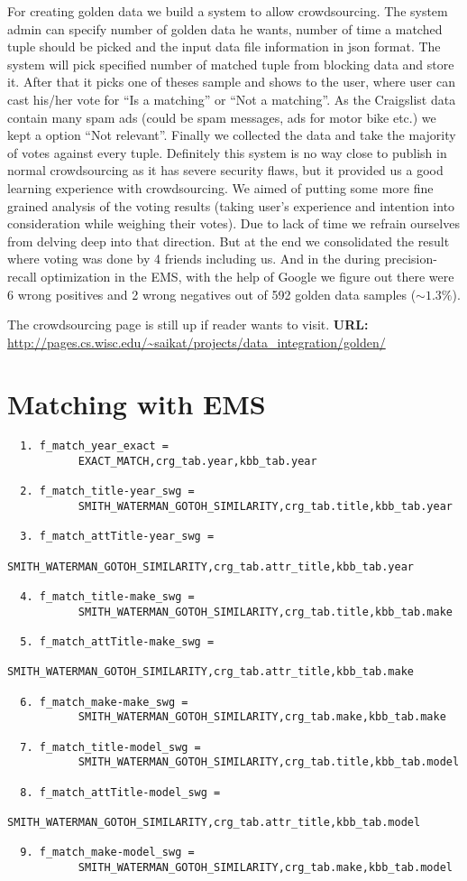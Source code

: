 \documentclass[dvips,11pt]{article}
\begin{document}
For creating golden data we build a system to allow crowdsourcing. The system admin can specify
number of golden data he wants, number of time a matched tuple should be picked and the input data
file information in json format. The system will pick specified number of matched tuple from
blocking data and store it. After that it picks one of theses sample and shows to the user, where
user can cast his/her vote for ``Is a matching'' or ``Not a matching''. As the Craigslist data
contain many spam ads (could be spam messages, ads for motor bike etc.) we kept a option ``Not
relevant''. Finally we collected the data and take the majority of votes against every
tuple. Definitely this system is no way close to publish in normal crowdsourcing as it has severe
security flaws, but it provided us a good learning experience with crowdsourcing. We aimed of
putting some more fine grained analysis of the voting results (taking user's experience and
intention into consideration while weighing their votes). Due to lack of time we refrain ourselves
from delving deep into that direction. But at the end we consolidated the result where voting was
done by 4 friends including us. And in the during precision-recall optimization in the EMS, with the
help of Google we figure out there were 6 wrong positives and 2 wrong negatives out of 592 golden
data samples ($\sim 1.3\%$).

The crowdsourcing page is still up if reader wants to visit. {\bf URL:}
\url{http://pages.cs.wisc.edu/~saikat/projects/data_integration/golden/}


\section{Matching with EMS}
\begin{verbatim}
  1. f_match_year_exact = 
           EXACT_MATCH,crg_tab.year,kbb_tab.year

  2. f_match_title-year_swg = 
           SMITH_WATERMAN_GOTOH_SIMILARITY,crg_tab.title,kbb_tab.year

  3. f_match_attTitle-year_swg = 
           SMITH_WATERMAN_GOTOH_SIMILARITY,crg_tab.attr_title,kbb_tab.year

  4. f_match_title-make_swg = 
           SMITH_WATERMAN_GOTOH_SIMILARITY,crg_tab.title,kbb_tab.make

  5. f_match_attTitle-make_swg = 
           SMITH_WATERMAN_GOTOH_SIMILARITY,crg_tab.attr_title,kbb_tab.make

  6. f_match_make-make_swg = 
           SMITH_WATERMAN_GOTOH_SIMILARITY,crg_tab.make,kbb_tab.make

  7. f_match_title-model_swg = 
           SMITH_WATERMAN_GOTOH_SIMILARITY,crg_tab.title,kbb_tab.model

  8. f_match_attTitle-model_swg = 
           SMITH_WATERMAN_GOTOH_SIMILARITY,crg_tab.attr_title,kbb_tab.model

  9. f_match_make-model_swg = 
           SMITH_WATERMAN_GOTOH_SIMILARITY,crg_tab.make,kbb_tab.model
\end{verbatim}
\end{document}
